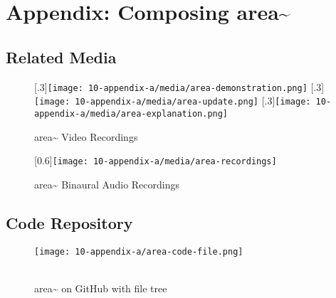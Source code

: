 \chapter{Appendix: Composing area\textasciitilde{}}

\section{Related Media}
\begin{figure}[!ht]
    \centering
    [.3\linewidth]{\texttt{[image: 10-appendix-a/media/area-demonstration.png]}}%
    \hfill
    [.3\linewidth]{\texttt{[image: 10-appendix-a/media/area-update.png]}}
    \hfill
    [.3\linewidth]{\texttt{[image: 10-appendix-a/media/area-explanation.png]}}
    \caption*{area\textasciitilde{} Video Recordings}
\end{figure}
\vspace*{1cm}
\begin{figure}[!ht]
    \centering
    [0.6\linewidth]{\texttt{[image: 10-appendix-a/media/area-recordings]}}
    \caption*{area\textasciitilde{} Binaural Audio Recordings}
\end{figure}
\clearpage



\section{Code Repository}
\begin{figure}[!ht]
    \texttt{[image: 10-appendix-a/area-code-file.png]}
    \caption*{ \\ area\textasciitilde{} on GitHub with file tree}
\end{figure}
\clearpage





